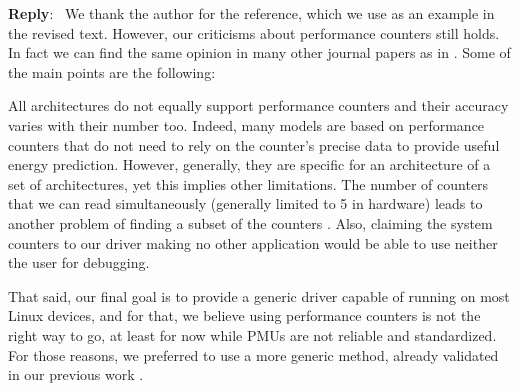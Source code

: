 \documentclass[11pt]{article}
\newcounter{reviewer}
\newcounter{point}[reviewer]
\newenvironment{reply}
   {\medskip \noindent \begin{sf}\textbf{Reply}:\ }
   {\medskip \end{sf}}
\begin{document}
\begin{reply}
We thank the author for the reference, which we use as an example in the revised text. However, our criticisms about performance counters still holds. In fact we can find the same opinion in many other journal papers as in \cite{Weaver2008, Weaver2013a, Das2019SoK:Security, McGuire2009, Ramos2019AnCounters}. Some of the main points are the following:

All architectures do not equally support performance counters and their accuracy varies with their number too. Indeed, many models are based on performance counters that do not need to rely on the counter's precise data to provide useful energy prediction. However, generally, they are specific for an architecture of a set of architectures, yet this implies other limitations. The number of counters that we can read simultaneously (generally limited to 5 in hardware) leads to another problem of finding a subset of the counters \cite{Silva-De-Souza2020Containergy-aWorkloads}. Also, claiming the system counters to our driver making no other application would be able to use neither the user for debugging.

That said, our final goal is to provide a generic driver capable of running on most Linux devices, and for that, we believe using performance counters is not the right way to go, at least for now while PMUs are not reliable and standardized. For those reasons, we preferred to use a more generic method, already validated in our previous work \cite{Silva2018Energy-optimalApplications}.
\end{reply}



\end{document}
